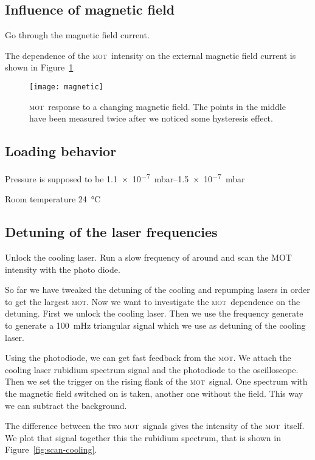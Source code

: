 \documentclass[11pt, english, fleqn, DIV=15, headinclude, BCOR=2cm]{scrreprt}
\newcommand\mot{\textsc{mot}}
\begin{document}
\subsection{Influence of magnetic field}

Go through the magnetic field current.


The dependence of the \mot\ intensity on the external magnetic field current is
shown in Figure~\ref{fig:magnetic}

\begin{figure}
    \centering
    \texttt{[image: magnetic]}
    \caption{%
        \mot\ response to a changing magnetic field. The points in the middle
        have been measured twice after we noticed some hysteresis effect.
    }
    \label{fig:magnetic}
\end{figure}

\subsection{Loading behavior}

Pressure is supposed to be \SIrange{1.1e-7}{1.5e-7}{\milli\bar}

Room temperature \SI{24}{\celsius}

\subsection{Detuning of the laser frequencies}

Unlock the cooling laser. Run a slow frequency of around
and scan the MOT intensity with the photo diode. 

So far we have tweaked the detuning of the cooling and repumping lasers in
order to get the largest \mot. Now we want to investigate the \mot\ dependence
on the detuning. First we unlock the cooling laser. Then we use the frequency
generate to generate a \SI{100}{\milli\hertz} triangular signal which we use
as detuning of the cooling laser.

Using the photodiode, we can get fast feedback from the \mot. We attach the
cooling laser rubidium spectrum signal and the photodiode to the oscilloscope.
Then we set the trigger on the rising flank of the \mot\ signal. One spectrum
with the magnetic field switched on is taken, another one without the field.
This way we can subtract the background.

The difference between the two \mot\ signals gives the intensity of the \mot\
itself. We plot that signal together this the rubidium spectrum, that is shown
in Figure~\ref{fig:scan-cooling}.
\end{document}
